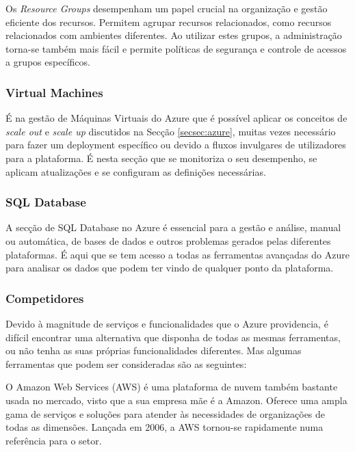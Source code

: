             Os \textit{Resource Groups} desempenham um papel crucial na organização e gestão eficiente dos recursos. Permitem agrupar recursos relacionados, como recursos relacionados com ambientes diferentes. Ao utilizar estes grupos, a administração torna-se também mais fácil e permite políticas de segurança e controle de acessos a grupos específicos. 

        \subsubsection{Virtual Machines}

            É na gestão de Máquinas Virtuais do Azure que é possível aplicar os conceitos de \textit{scale out} e \textit{scale up} discutidos na Secção \ref{secsec:azure}, muitas vezes necessário para fazer um deployment específico ou devido a fluxos invulgares de utilizadores para a plataforma. É nesta secção que se monitoriza o seu desempenho, se aplicam atualizações e se configuram as definições necessárias.

        \subsubsection{SQL Database} %

            A secção de SQL Database no Azure é essencial para a gestão e análise, manual ou automática, de bases de dados e outros problemas gerados pelas diferentes plataformas. É aqui que se tem acesso a todas as ferramentas avançadas do Azure para analisar os dados que podem ter vindo de qualquer ponto da plataforma.

        \subsubsection{Competidores}\label{competidores-azure}

            Devido à magnitude de serviços e funcionalidades que o Azure providencia, é difícil encontrar uma alternativa que disponha de todas as mesmas ferramentas, ou não tenha as suas próprias funcionalidades diferentes. Mas algumas ferramentas que podem ser consideradas são as seguintes:

            \label{competidores-aws}

                O Amazon Web Services (AWS) é uma plataforma de nuvem também bastante usada no mercado, visto que a sua empresa mãe é a Amazon. Oferece uma ampla gama de serviços e soluções para atender às necessidades de organizações de todas as dimensões. Lançada em 2006, a AWS tornou-se rapidamente numa referência para o setor.

